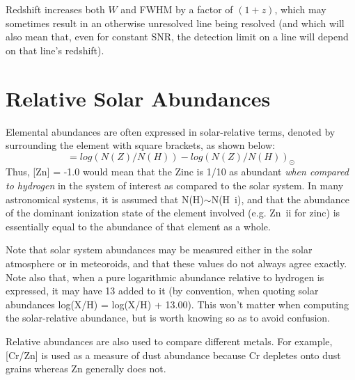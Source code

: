 Redshift increases both $W$ and FWHM by a factor of $(1 + z)$, which may sometimes result in an otherwise unresolved line being resolved (and which will also mean that, even for constant SNR, the detection limit on a line will depend on that line's redshift).

\section{Relative Solar Abundances}

Elemental abundances are often expressed in solar-relative terms, denoted by surrounding the element with square brackets, as shown below:
\begin{equation}
	[Z] = log(N(Z)/N(H)) - log(N(Z)/N(H))_\odot
\end{equation}
Thus, [Zn] = -1.0 would mean that the Zinc is 1/10 as abundant \emph{when compared to hydrogen} in the system of interest as compared to the solar system. In many astronomical systems, it is assumed that N(H)$\sim$N(H~{\sc i}), and that the abundance of the dominant ionization state of the element involved (e.g. Zn~{\sc ii} for zinc) is essentially equal to the abundance of that element as a whole.

Note that solar system abundances may be measured either in the solar atmosphere or in meteoroids, and that these values do not always agree exactly. Note also that, when a pure logarithmic abundance relative to hydrogen is expressed, it may have 13 added to it (by convention, when quoting solar abundances log(X/H) = log(X/H) + 13.00). This won't matter when computing the solar-relative abundance, but is worth knowing so as to avoid confusion.

Relative abundances are also used to compare different metals. For example, [Cr/Zn] is used as a measure of dust abundance because Cr depletes onto dust grains whereas Zn generally does not.

